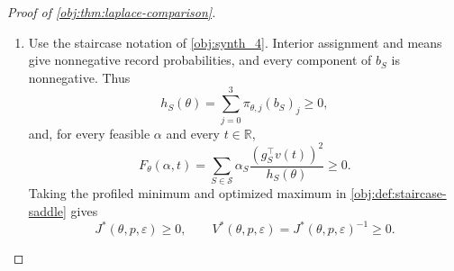 \begin{proof}[Proof of \cref{obj:thm:laplace-comparison}]
\begin{enumerate}
The Laplace density is
\[
f_{\mathrm{Lap}}(\ell)
=
\frac{1}{2b_{\mathrm{Lap}}}
\exp\!\left(-\frac{|\ell|}{b_{\mathrm{Lap}}}\right),
\qquad \ell\in\mathbb R.
\]
Its symmetry gives \(\mathbb E[L_i]=0\). The gamma integral at shape three gives
\[
\int_0^\infty
\ell^2e^{-\ell/b_{\mathrm{Lap}}}\,d\ell
=
2b_{\mathrm{Lap}}^3,
\]
and hence
\[
\mathbb E[L_i^2]
=
\frac{1}{b_{\mathrm{Lap}}}
\int_0^\infty
\ell^2e^{-\ell/b_{\mathrm{Lap}}}\,d\ell
=
2b_{\mathrm{Lap}}^2
=
\frac{2\Delta_A^2}{\varepsilon^2}.
\]
Since \(A_{\mathrm{trial},i}\) is a function of \(X_i\), its independence from \(L_i\) yields
\[
\mathbb E[L_iA_{\mathrm{trial},i}]
=
\mathbb E[L_i]\mathbb E[A_{\mathrm{trial},i}]
=0.
\]
For the releases of \cref{obj:def:oa-release}, it follows that
\[
\mathbb E[\widetilde A_i]=\tau,
\qquad
\mathbb E[\widetilde A_i^2]
=
\frac{\mu_1}{p}+\frac{\mu_0}{q}
+\frac{2\Delta_A^2}{\varepsilon^2}.
\]
Define their centered versions by
\[
\xi_{\mathrm{OA},i}=\widetilde A_i-\tau.
\]
Expanding the centered square gives
\[
\mathbb E[\xi_{\mathrm{OA},i}]=0,
\qquad
\mathbb E[\xi_{\mathrm{OA},i}^2]
=
\mathbb E[\widetilde A_i^2]
-2\tau\mathbb E[\widetilde A_i]+\tau^2
=
V_{\mathrm{OA}}(\theta,p,\varepsilon)<\infty.
\]

The pairs \((X_i,L_i)\) are independent across subjects. Each pair has the same product law, because the record law and the noise law are common across subjects and its two coordinates are independent. Applying the release function to each pair shows that the centered releases are independent and identically distributed. The iid central limit theorem therefore gives
\[
\frac{1}{\sqrt n}\sum_{i=1}^n\xi_{\mathrm{OA},i}
\rightsquigarrow
N\!\left(0,V_{\mathrm{OA}}(\theta,p,\varepsilon)\right).
\]
For every \(n\ge1\),
\[
\frac{1}{\sqrt n}\sum_{i=1}^n\xi_{\mathrm{OA},i}
=
\sqrt n(\widehat\tau_{\mathrm{OA}}-\tau).
\]
At \(n=0\), both normalized expressions are zero under the stated conventions. This proves the asserted convergence in law.

\item Use the staircase notation of \cref{obj:synth_4}. Interior assignment and means give nonnegative record probabilities, and every component of \(b_S\) is nonnegative. Thus
\[
h_S(\theta)
=
\sum_{j=0}^3\pi_{\theta,j}(b_S)_j\ge0,
\]
and, for every feasible \(\alpha\) and every \(t\in\mathbb R\),
\[
F_\theta(\alpha,t)
=
\sum_{S\in\mathcal S}
\alpha_S\frac{(g_S^\top v(t))^2}{h_S(\theta)}
\ge0.
\]
Taking the profiled minimum and optimized maximum in
\cref{obj:def:staircase-saddle} gives
\[
J^*(\theta,p,\varepsilon)\ge0,
\qquad
V^*(\theta,p,\varepsilon)=J^*(\theta,p,\varepsilon)^{-1}\ge0.
\]


\end{enumerate}
\end{proof}
